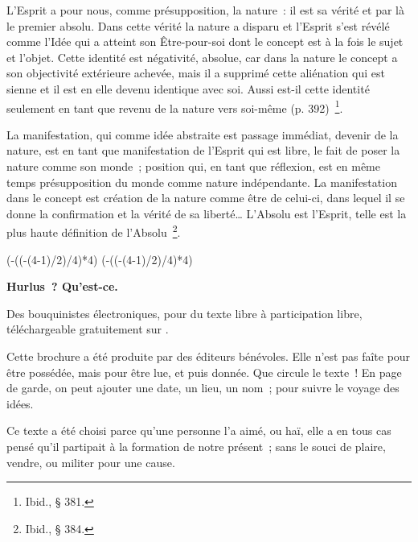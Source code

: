 \documentclass[french,twoside]{book} %
\newenvironment{quoteblock}%
  {\begin{quoting}}
  {\end{quoting}}
\def\truncdiv#1#2{((#1-(#2-1)/2)/#2)}
\def\moduloop#1#2{(#1-\truncdiv{#1}{#2}*#2)}
\def\modulo#1#2{\number\numexpr\moduloop{#1}{#2}\relax}
\newenvironment{quotebar}{%
    \def\FrameCommand{{\color{rubric!10!}\vrule width 0.5em} \hspace{0.9em}}%
    \def\OuterFrameSep{\itemsep} %
    \MakeFramed {\advance\hsize-\width \FrameRestore}
  }%
  {%
    \endMakeFramed
  }
\renewenvironment{quoteblock}%
  {%
    \savenotes
    \setstretch{0.9}
    \normalfont
    \begin{quotebar}
  }
  {%
    \end{quotebar}
    \spewnotes
  }
\begin{document}
\begin{quoteblock}
 \noindent L’Esprit a pour nous, comme présupposition, la nature : il est sa vérité et par là le premier absolu. Dans cette vérité la nature a disparu et l’Esprit s’est révélé comme l’Idée qui a atteint son Être-pour-soi dont le concept est à la fois le sujet et l’objet. Cette identité est négativité, absolue, car dans la nature le concept a son objectivité extérieure achevée, mais il a supprimé cette aliénation qui est sienne et il est en elle devenu identique avec soi. Aussi est-il cette identité seulement en tant que revenu de la nature vers soi-même (p. 392) \footnote{Ibid., § 381.}.\par
 La manifestation, qui comme idée abstraite est passage immédiat, devenir de la nature, est en tant que manifestation de l’Esprit qui est libre, le fait de poser la nature comme son monde ; position qui, en tant que réflexion, est en même temps présupposition du monde comme nature indépendante. La manifestation dans le concept est création de la nature comme être de celui-ci, dans lequel il se donne la confirmation et la vérité de sa liberté… L’Absolu est l’Esprit, telle est la plus haute définition de l’Absolu \footnote{Ibid., § 384.}.
 \end{quoteblock}

 


\ifbooklet
  \pagestyle{empty}
  \clearpage
  \ifnum\modulo{\value{page}}{4}=0 \hbox{}\newpage\hbox{}\newpage\fi
  \ifnum\modulo{\value{page}}{4}=1 \hbox{}\newpage\hbox{}\newpage\fi


  \hbox{}\newpage
  \ifodd\value{page}\hbox{}\newpage\fi
  {\centering\color{rubric}\bfseries\noindent\large
    Hurlus ? Qu’est-ce.\par
    \bigskip
  }
  \noindent Des bouquinistes électroniques, pour du texte libre à participation libre,
  téléchargeable gratuitement sur \href{https://hurlus.fr}{}.\par
  \bigskip
  \noindent Cette brochure a été produite par des éditeurs bénévoles.
  Elle n’est pas faîte pour être possédée, mais pour être lue, et puis donnée.
  Que circule le texte !
  En page de garde, on peut ajouter une date, un lieu, un nom ; pour suivre le voyage des idées.
  \par

  Ce texte a été choisi parce qu’une personne l’a aimé,
  ou haï, elle a en tous cas pensé qu’il partipait à la formation de notre présent ;
  sans le souci de plaire, vendre, ou militer pour une cause.
  \par
\end{document}
